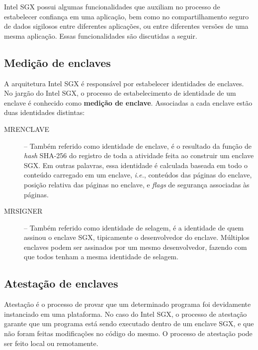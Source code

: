 Intel SGX possui algumas funcionalidades que auxiliam no processo de estabelecer
confiança em uma aplicação, bem como no compartilhamento seguro de dados
sigilosos entre diferentes aplicações, ou entre diferentes versões de uma mesma
aplicação. Essas funcionalidades são discutidas a seguir.

\subsection{Medição de enclaves}
\label{subsec:sgx_funcionalidades_medicao_enclaves}

A arquitetura Intel SGX é responsável por estabelecer identidades de enclaves.
No jargão do Intel SGX, o processo de estabelecimento de identidade de um
enclave é conhecido como \textbf{medição de enclave}.
Associadas a cada enclave estão duas identidades distintas:

\begin{description}
    \item [MRENCLAVE] -- Também referido como identidade de enclave, é o
    resultado da função de \textit{hash} SHA-256 do registro de toda a atividade feita ao construir um
    enclave SGX. Em outras palavras, essa identidade é calculada baseada em todo
    o conteúdo carregado em um enclave, \textit{i.e.}, conteúdos das páginas do
    enclave, posição relativa das páginas no enclave, e \textit{flags} de
    segurança associadas às páginas.

    \item [MRSIGNER] -- Também referido como identidade de selagem, é a
    identidade de quem assinou o enclave SGX, tipicamente o desenvolvedor do
    enclave. Múltiplos enclaves podem ser assinados por um mesmo desenvolvedor,
    fazendo com que todos tenham a mesma identidade de selagem.

\end{description}

\subsection{Atestação de enclaves}
\label{subsec:sgx_funcionalidades_atestacao_enclaves}

Atestação é o processo de provar que um determinado programa foi devidamente
instanciado em uma plataforma. No caso do Intel SGX, o processo de atestação
garante que um programa está sendo executado dentro de um enclave SGX, e que não
foram feitas modificações no código do mesmo. O processo de atestação pode ser
feito local ou remotamente.

